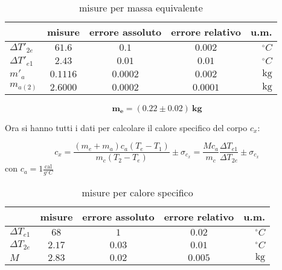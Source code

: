 \documentclass{article}
\begin{document}
	\begin{table}[H] \centering
		\begin{small}
			\begin{tabular}{@{}lcccr@{}}\toprule
								&  	\textbf{misure}	& \textbf{errore assoluto} & \textbf{errore relativo}  & u.m.\\ \midrule
				\(\Delta T'_{2e}\)	&  \(61.6\)	& \(0.1\)	& \(0.002\)	&\(^\circ C\)			\\  \hdashline
				\(\Delta T'_{e1}\)	&  \(2.43\)	& \(0.01\)	& \(0.01\)	&\(^\circ C\)			\\  \hdashline
				\(m'_{a}\)			&  \(0.1116\)	& \(0.0002\)	& \(0.002\)	&\(\SI{}{\kilogram}\) 	 \\  \hdashline
				\(m_{a(2)}\)		    &  \(2.6000\)    & \(0.0002\)	& \(0.0001\)	&\(\SI{}{\kilogram}\) 	\\ \bottomrule
			\end{tabular}
			\caption{misure per massa equivalente}
			\label{table:Tabella massa eqiuivalente 1}
		\end{small}
	\end{table}
	
	
	\[ 
	\boxed{\boldsymbol{m_{e} = (0.22 \pm 0.02)\SI{}{\kilogram}}}
	\]
	
	\noindent
	Ora si hanno tutti i dati per calcolare il calore specifico del corpo \(c_{x}\):
	
	\[ 
	c_{x} = \frac{(m_{e} + m_{a})c_{a}(T_{e} - T_{1})}{m_{c}(T_{2}-T_{e})} \pm \sigma_{c_x} = \frac{Mc_{a}}{m_{c}}\frac{\Delta T_{e1}}{\Delta T_{2e}}\pm \sigma_{c_x} 
	\]
	con \(c_{a} = 1 \frac{\text{cal}}{g ^\circ C}\)
	\begin{table}[H] \centering
		\begin{small}
			\begin{tabular}{@{}lcccr@{}}\toprule
				&  	\textbf{misure}	& \textbf{errore assoluto} & \textbf{errore relativo}  & u.m.\\ \midrule
				\(\Delta T_{e1}\)	&  \(68\)	& \(1\)	& \(0.02\)	&\(^\circ C\)			\\  \hdashline
				\(\Delta T_{2e}\)	&  \(2.17\)	& \(0.03\)	& \(0.01\)	&\(^\circ C\)			\\  \hdashline
				\(M\)		    &  \(2.83\)    & \(0.02\)	& \(0.005\)	&\(\SI{}{\kilogram}\) 	\\  \bottomrule
			\end{tabular}
			\caption{misure per calore specifico}
			\label{table:Tabella calore specifico 1}
		\end{small}
	\end{table}
	
\end{document}
